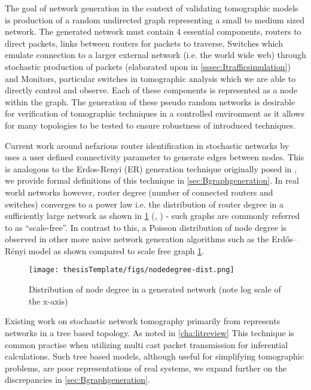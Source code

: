 The goal of network generation in the context of validating tomographic models is production of a random undirected graph representing a small to medium sized network. The generated network must contain 4 essential components, routers to direct packets, links between routers for packets to traverse, Switches which emulate connection to a larger external network (i.e. the world wide web) through stochastic production of packets (elaborated upon in \cref{sssec:Itrafficsimulation}) and Monitors, particular switches in tomographic analysis which we are able to directly control and observe. Each of these components is represented as a node within the graph. The generation of these pseudo random networks is desirable for verification of tomographic techniques in a controlled environment as it allows for many topologies to be tested to ensure robustness of introduced techniques.\par
Current work around nefarious router identification in stochastic networks by \cite{barnes_stochastic_2020} uses a user defined connectivity parameter to generate edges between nodes. This is analogous to the Erdos-Renyi (ER) generation technique originally posed in \cite{erdos_random_1959}, we provide formal definitions of this technique in \cref{sec:Bgraphgeneration}. In real world networks however, router degree (number of connected routers and switches) converges to a power law i.e. the distribution of router degree in a sufficiently large network as shown in \ref{fig:nddist} (\cite{chen_origin_2002}, \cite{zhao_measurement_2020}) - such graphs are commonly referred to as “scale-free”. In contrast to this, a Poisson distribution of node degree is observed in other more naive network generation algorithms such as the Erdős–Rényi model as shown compared to scale free graph \ref{fig:nddist}.
\begin{figure}[ht]
    \centering
    \texttt{[image: thesisTemplate/figs/nodedegree-dist.png]}
    \caption[Distribution of node degree in a generated network]{Distribution of node degree in a generated network (note log scale of the x-axis) \cite{baronchelli_networks_2013}}
    \label{fig:nddist}
\end{figure}
Existing work on stochastic network tomography primarily from \cite{thoppe_stochastic_2014} \cite{kolar_distributed_2020} represents networks in a tree based topology. As noted in \cref{cha:litreview} This technique is common practise when utilizing multi cast packet transmission for inferential calculations. Such tree based models, although useful for simplifying tomographic problems, are poor representations of real systems, we expand further on the discrepancies in \cref{sec:Bgraphgeneration}.

